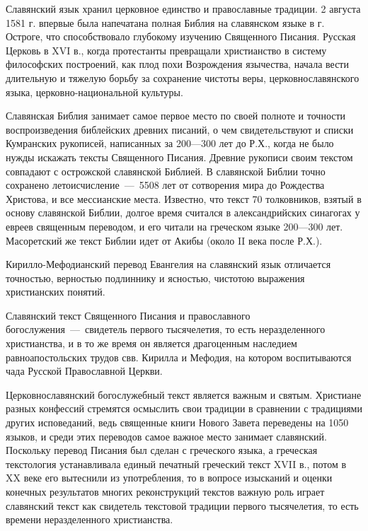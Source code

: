 \documentclass[11pt,a4paper]{memoir}
\begin{document}
    Славянский язык хранил церковное единство и православные традиции. 2 августа 1581 г. впервые была напечатана полная Библия на славянском языке в г. Остроге, что способствовало глубокому изучению Священного Писания. Русская Церковь в XVI в., когда протестанты превращали христианство в систему философских построений, как плод похи Возрождения язычества, начала вести длительную и тяжелую борьбу за сохранение чистоты веры, церковнославянского языка, церковно-национальной культуры.
    
    Славянская Библия занимает самое первое место по своей полноте и точности воспроизведения библейских древних писаний, о чем свидетельствуют и списки Кумранских рукописей, написанных за 200---300 лет до Р.Х., когда не было нужды искажать тексты Священного Писания. Древние рукописи своим текстом совпадают с острожской славянской Библией. В славянской Библии точно сохранено летоисчисление~---~5508 лет от сотворения мира до Рождества Христова, и все мессианские места. Известно, что текст 70 толковников, взятый в основу славянской Библии, долгое время считался в александрийских синагогах у евреев священным переводом, и его читали на греческом языке 200---300 лет. Масоретский же текст Библии идет от Акибы (около II века после Р.Х.).
    
    Кирилло-Мефодианский перевод Евангелия на славянский язык отличается точностью, верностью подлиннику и ясностью, чистотою выражения христианских понятий.
    
    Славянский текст Священного Писания и православного богослужения~---~свидетель первого тысячелетия, то есть неразделенного христианства, и в то же время он является драгоценным наследием равноапостольских трудов свв. Кирилла и Мефодия, на котором воспитываются чада Русской Православной Церкви.
    
    Церковнославянский богослужебный текст является важным и святым. Христиане разных конфессий стремятся осмыслить свои традиции в сравнении с традициями других исповеданий, ведь священные книги Нового Завета переведены на 1050 языков, и среди этих переводов самое важное место занимает славянский. Поскольку перевод Писания был сделан с греческого языка, а греческая текстология устанавливала единый печатный греческий текст XVII в., потом в XX веке его вытеснили из употребления, то в вопросе изысканий и оценки конечных результатов многих реконструкций текстов важную роль играет славянский текст как свидетель текстовой традиции первого тысячелетия, то есть времени неразделенного христианства.
    
\end{document}
